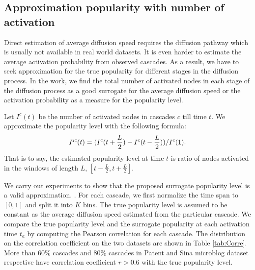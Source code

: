 \subsection{Approximation popularity with number of activation}
\quad Direct estimation of average diffusion speed requires the diffusion pathway which is usually not available in real world datasets. It is even harder to estimate the average activation probability from observed cascades. As a result, we have to seek approximation for the true popularity for different stages in the diffusion process. In the work, we find the total number of activated nodes in each stage of the diffusion process as a good surrogate for the average diffusion speed or the activation probability as a measure for the popularity level. 

Let $I^c(t)$ be the number of activated nodes in cascades $c$ till time $t$. We approximate the popularity level with the following formula:
$$
P^c(t) = (I^c(t+\frac{L}{2}) - I^c(t-\frac{L}{2})) / I^c(1).
$$
That is to say, the estimated popularity level at time $t$ is ratio of nodes activated in the windows of length $L$, $[t-\frac{L}{2}, t+\frac{L}{2}]$. 

We carry out experiments to show that the proposed surrogate popularity level is a valid approximation. . For each cascade, we first normalize the time span to $[0,1]$ and split it into $K$ bins. The true popularity level is assumed to be constant as the average diffusion speed estimated from the particular cascade. We compare the true popularity level and the surrogate popularity at each activation time $t_a$ by computing the Pearson correlation for each cascade. The distribution on the correlation coefficient on the two datasets are shown in Table \ref{tab:Corre}. More than 60\% cascades and 80\% cascades in Patent and Sina microblog dataset respective have correlation coefficient $r>0.6$ with the true popularity level.   


